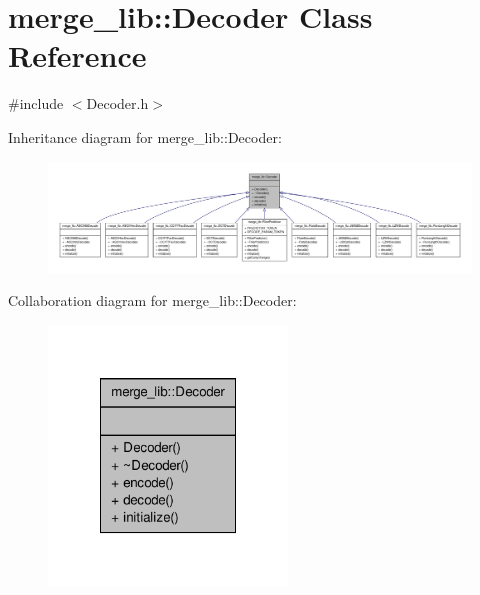 \hypertarget{classmerge__lib_1_1_decoder}{\section{merge\-\_\-lib\-:\-:Decoder Class Reference}
\label{d3/dbb/classmerge__lib_1_1_decoder}
}


{\ttfamily \#include $<$Decoder.\-h$>$}



Inheritance diagram for merge\-\_\-lib\-:\-:Decoder\-:
\nopagebreak
\begin{figure}[H]
\begin{center}
\leavevmode
\includegraphics[width=350pt]{df/de0/classmerge__lib_1_1_decoder__inherit__graph}
\end{center}
\end{figure}


Collaboration diagram for merge\-\_\-lib\-:\-:Decoder\-:
\nopagebreak
\begin{figure}[H]
\begin{center}
\leavevmode
\includegraphics[width=180pt]{d3/dbe/classmerge__lib_1_1_decoder__coll__graph}
\end{center}
\end{figure}
